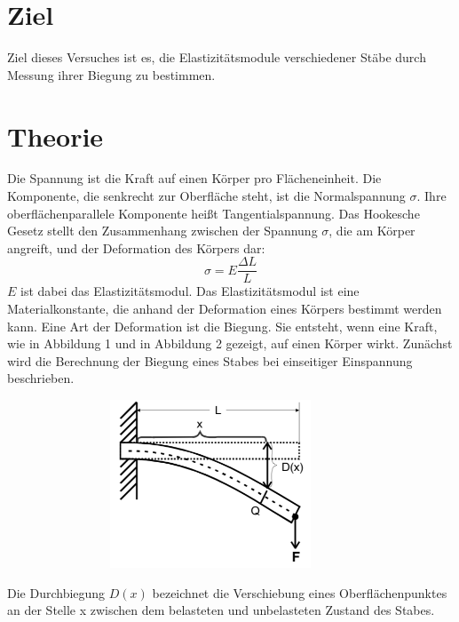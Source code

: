 

\maketitle
\tableofcontents
\newpage
\section{Ziel}
Ziel dieses Versuches ist es, die Elastizitätsmodule
verschiedener Stäbe durch Messung ihrer Biegung
zu bestimmen.
\section{Theorie}
Die Spannung ist die Kraft auf einen Körper pro Flächeneinheit.
Die Komponente, die senkrecht zur Oberfläche steht,
ist die Normalspannung $\sigma$. Ihre oberflächenparallele
Komponente heißt Tangentialspannung.
Das Hookesche Gesetz stellt den Zusammenhang zwischen
der Spannung $\sigma$, die am Körper angreift, und der
Deformation des Körpers dar:
\begin{equation}
\sigma = E \frac{\Delta L}{L}
\label{eqn:Hooke}
\end{equation}
$E$ ist dabei das Elastizitätsmodul.
Das Elastizitätsmodul ist eine Materialkonstante, die
anhand der Deformation eines Körpers bestimmt werden kann.
Eine Art der Deformation ist die Biegung. Sie entsteht, wenn
eine Kraft, wie in Abbildung 1 und in Abbildung 2 gezeigt, auf einen Körper wirkt. %
Zunächst wird die Berechnung der Biegung eines Stabes bei einseitiger
Einspannung beschrieben. %
\begin{figure}
    \centering
\includegraphics[width= 10cm, height= 5cm]{./plots/abb1.png}
\caption{}
\label{fig:abb1}
\end{figure}
Die Durchbiegung $D(x)$ bezeichnet die Verschiebung eines Oberflächenpunktes
an der Stelle x zwischen dem belasteten und unbelasteten Zustand des Stabes.
